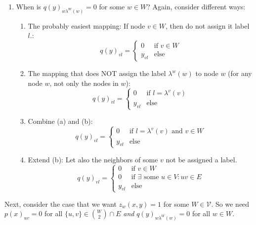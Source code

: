 \begin{enumerate}
\item When is $q(y)_{w \lambda^W(w)}=0$ for some $w\in W$? Again, consider different ways:
\begin{enumerate}
\item The probably easiest mapping: If node $v \in W$, then do not assign it label $l$.: \begin{equation}
        q(y)_{vl}= \begin{cases}
        0 & \text{if } v \in W \\
        y_{vl} & \text{else} 
        \end{cases}
    \end{equation}
    \item The mapping that does NOT assign the label $\lambda^w(w)$ to node $w$ (for any node $w$, not only the nodes in $w$): 
    \begin{equation}
        q(y)_{vl}= \begin{cases}
        0 & \text{if } l=\lambda^v(v) \\
        y_{vl} & \text{else} 
        \end{cases}
    \end{equation}
    \item Combine (a) and (b):
    \begin{equation}
        q(y)_{vl}= \begin{cases}
        0 & \text{if } l=\lambda^v(v) \text{ and } v \in W \\
        y_{vl} & \text{else} 
        \end{cases}
    \end{equation}
     \item Extend (b): Let also the neighbors of some $v$ not be assigned a label.
    \begin{equation}
        q(y)_{vl}= \begin{cases}
        0 & \text{if }  v \in W \\
        0 & \text{if } \exists \text{ some } u \in V: uv \in E  \\
        y_{vl} & \text{else} 
        \end{cases}
    \end{equation}
\end{enumerate}
\end{enumerate} 
Next, consider the case that we want $z_w(x,y)=1$ for some $W \in \mathcal{V}$. So we need $p(x)_{uv}=0$ for all $\{u,v\} \in \binom{W}{2} \cap E$ \textit{and} $q(y)_{w \lambda^W(w)}=0$ for all $w\in W$. 
